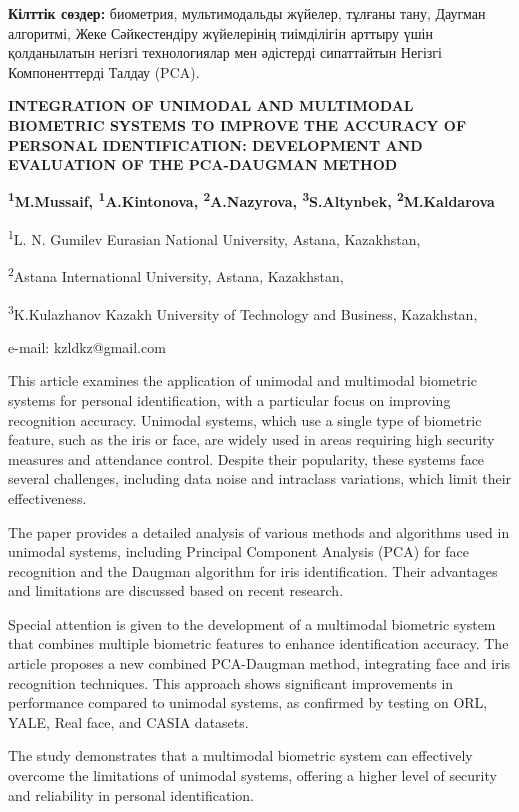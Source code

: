 {\bfseries Кілттік сөздер:} биометрия, мультимодальды жүйелер, тұлғаны
тану, Даугман алгоритмі, Жеке Сәйкестендіру жүйелерінің тиімділігін
арттыру үшін қолданылатын негізгі технологиялар мен әдістерді
сипаттайтын Негізгі Компоненттерді Талдау (PCA).

{\bfseries INTEGRATION OF UNIMODAL AND MULTIMODAL BIOMETRIC SYSTEMS TO
IMPROVE THE ACCURACY OF PERSONAL IDENTIFICATION: DEVELOPMENT AND
EVALUATION OF THE PCA-DAUGMAN METHOD}

{\bfseries \textsuperscript{1}M.Mussaif, \textsuperscript{1}A.Kintonova,
\textsuperscript{2}A.Nazyrova, \textsuperscript{3}S.Altynbek,
\textsuperscript{2}M.Kaldarova}

\textsuperscript{1}L. N. Gumilev Eurasian National University, Astana,
Kazakhstan,

\textsuperscript{2}Astana International University, Astana, Kazakhstan,

\textsuperscript{3}K.Kulazhanov Kazakh University of Technology and
Business, Kazakhstan,

e-mail: kzldkz@gmail.com

This article examines the application of unimodal and multimodal
biometric systems for personal identification, with a particular focus
on improving recognition accuracy. Unimodal systems, which use a single
type of biometric feature, such as the iris or face, are widely used in
areas requiring high security measures and attendance control. Despite
their popularity, these systems face several challenges, including data
noise and intraclass variations, which limit their effectiveness.

The paper provides a detailed analysis of various methods and algorithms
used in unimodal systems, including Principal Component Analysis (PCA)
for face recognition and the Daugman algorithm for iris identification.
Their advantages and limitations are discussed based on recent research.

Special attention is given to the development of a multimodal biometric
system that combines multiple biometric features to enhance
identification accuracy. The article proposes a new combined PCA-Daugman
method, integrating face and iris recognition techniques. This approach
shows significant improvements in performance compared to unimodal
systems, as confirmed by testing on ORL, YALE, Real face, and CASIA
datasets.

The study demonstrates that a multimodal biometric system can
effectively overcome the limitations of unimodal systems, offering a
higher level of security and reliability in personal identification.

